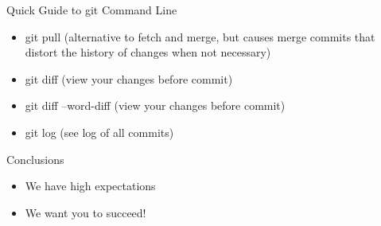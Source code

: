 \documentclass[hyperref={pdfpagelabels=false}, aspectratio=1610]{beamer}
\begin{document}
\begin{frame}
\begin{block}{Quick Guide to git Command Line}
 \begin{itemize}
  \item git pull \quad (alternative to fetch and merge, but causes merge commits that distort the history of changes when not necessary)
  \item git diff \quad (view your changes before commit)
  \item git diff --word-diff \quad (view your changes before commit)
  \item git log \quad (see log of all commits)
 \end{itemize}
\end{block}
\end{frame}

\begin{frame}
\begin{block}{Conclusions}
 \begin{itemize}
  \item We have high expectations
  \item We want you to succeed!
 \end{itemize}
\end{block}
\end{frame}
\end{document}
